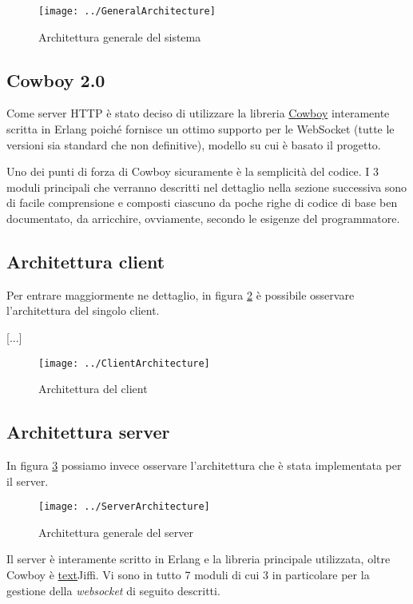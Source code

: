 \documentclass[paper=a4, fontsize=11pt]{scrartcl} %
\numberwithin{equation}{section} %
\numberwithin{figure}{section} %
\numberwithin{table}{section} %
\begin{document}
\begin{figure}
\centering
\texttt{[image: ../GeneralArchitecture]}
\caption{Architettura generale del sistema}
\label{GenArc}
\end{figure}

\subsection{Cowboy 2.0}
Come server HTTP è stato deciso di utilizzare la libreria \href{https://github.com/ninenines/cowboy}{Cowboy} interamente scritta in Erlang poiché fornisce un ottimo supporto per le WebSocket (tutte le versioni sia standard che non definitive), modello su cui è basato il progetto.

Uno dei punti di forza di Cowboy sicuramente è la semplicità del codice. I 3 moduli principali che verranno descritti nel dettaglio nella sezione successiva sono di facile comprensione e composti ciascuno da poche righe di codice di base ben documentato, da arricchire, ovviamente, secondo le esigenze del programmatore.

\subsection{Architettura client}
Per entrare maggiormente ne dettaglio, in figura \ref{ClientArc} è possibile osservare l'architettura del singolo client.

[...]

\begin{figure}
\centering
\texttt{[image: ../ClientArchitecture]}
\caption{Architettura del client}
\label{ClientArc}
\end{figure}

\subsection{Architettura server}
In figura \ref{ServerArc} possiamo invece osservare l'architettura che è stata implementata per il server.

\begin{figure}
\centering
\texttt{[image: ../ServerArchitecture]}
\caption{Architettura generale del server}
\label{ServerArc}
\end{figure}

Il server è interamente scritto in Erlang e la libreria principale utilizzata, oltre Cowboy è \href{https://github.com/davisp/jiffy}{text}{Jiffi}. Vi sono in tutto 7 moduli di cui 3 in particolare per la gestione della \textit{websocket} di seguito descritti.
\end{document}
